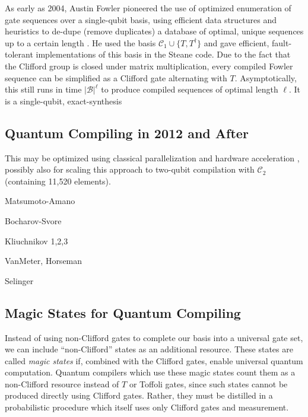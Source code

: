 
As early as 2004, Austin Fowler pioneered the use of optimized enumeration
of gate sequences over a single-qubit basis, using efficient data structures
and heuristics to de-dupe (remove duplicates) a database of optimal, unique
sequences up to
a certain length \cite{Fowler2011}. He used the basis $\mathcal{C}_1 \cup \{ T, T^{\dagger} \}$
and gave efficient, fault-tolerant implementations of this basis in the
Steane code. Due to the fact that the Clifford group is closed under
matrix multiplication, every compiled Fowler sequence can be simplified as a
Clifford gate alternating with $T$. Asymptotically, this still runs in time
$|\mathcal{B}|^\ell$ to produce compiled sequences of optimal length $\ell$.
It is a single-qubit, exact-synthesis


\subsection{Quantum Compiling in 2012 and After}
\label{subsec:qcompiile-post2012}

This may be optimized using classical parallelization and hardware acceleration
\cite{Booth2012}, possibly also for scaling this approach to
two-qubit compilation with $\mathcal{C}_2$ (containing 11,520
elements).

Matsumoto-Amano

Bocharov-Svore

Kliuchnikov 1,2,3

VanMeter, Horseman

Selinger

\subsection{Magic States for Quantum Compiling}

Instead of using non-Clifford gates to complete our basis into a universal
gate set, we can include ``non-Clifford'' states as an additional resource.
These states are called \emph{magic states} if, combined with the Clifford
gates, enable universal quantum computation.
Quantum compilers which use these magic states count them as a non-Clifford
resource instead of $T$ or Toffoli gates, since such states cannot
be produced directly using Clifford gates. Rather, they must be
distilled in a probabilistic procedure which itself uses only 
Clifford gates and measurement.

